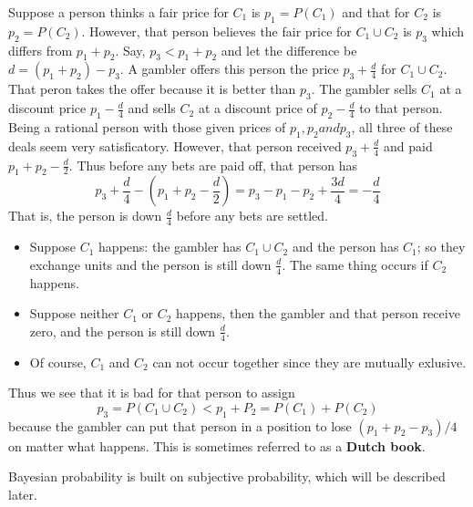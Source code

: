 \documentclass[a4paper]{book}
\newenvironment{proof}[1][Proof]{\begin{trivlist}
\item[\hskip \labelsep {\bfseries #1}]}{\end{trivlist}}
\begin{document}
  \begin{proof}
    Suppose a person thinks a fair price for $C_1$ is $p_1 = P(C_1)$ and
    that for $C_2$ is $p_2 = P(C_2)$. However, that person believes the
    fair price for $C_1 \cup C_2$ is $p_3$ which differs from $p_1 +
    p_2$. Say, $p_3 < p_1 + p_2$ and let the difference be $d = (p_1 +
    p_2) - p_3$. A gambler offers this person the price $p_3 +
    \frac{d}{4}$ for $C_1 \cup C_2$. That peron takes the offer because
    it is better than $p_3$. The gambler sells $C_1$ at a discount price
    $p_1 - \frac{d}{4}$ and sells $C_2$ at a discount price of $p_2 -
    \frac{d}{4}$ to that person. Being a rational person with those
    given prices of $p_1, p_2 and p_3$, all three of these deals seem
    very satisficatory. However, that person received $p_3 +
    \frac{d}{4}$ and paid $p_1 + p_2 - \frac{d}{2}$. Thus before any
    bets are paid off, that person has
    \begin{displaymath}
      p_3 + \frac{d}{4} - (p_1 + p_2 - \frac{d}{2}) = p_3 - p_1 - p_2 +
      \frac{3d}{4} = - \frac{d}{4}
    \end{displaymath}
    That is, the person is down $\frac{d}{4}$ before any bets are settled.
    \begin{itemize}
      \item Suppose $C_1$ happens: the gambler has $C_1 \cup C_2$ and
        the person has $C_1$; so they exchange units and the person is
        still down $\frac{d}{4}$. The same thing occurs if $C_2$
        happens.
      \item
        Suppose neither $C_1$ or $C_2$ happens, then the gambler and
        that person receive zero, and the person is still down
        $\frac{d}{4}$.
      \item
        Of course, $C_1$ and $C_2$ can not occur together since they are
        mutually exlusive.
    \end{itemize}

    Thus we see that it is bad for that person to assign
    \begin{displaymath}
      p_3 = P(C_1 \cup C_2) < p_1 + P_2 = P(C_1) + P(C_2)
    \end{displaymath}
    because the gambler can put that person in a position to lose $(p_1
    + p_2 - p_3)/4$ on matter what happens. This is sometimes referred
    to as a \textbf{Dutch book}.
  \end{proof}

  Bayesian probability is built on subjective probability, which will be
  described later.
\end{document}
